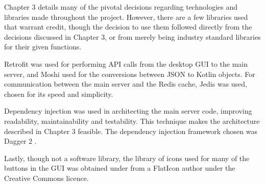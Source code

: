 Chapter 3 details many of the pivotal decisions regarding technologies and libraries made throughout the project. However, there are a few libraries used that warrant credit, though the decision to use them followed directly from the decisions discussed in Chapter 3, or from merely being industry standard libraries for their given functions.

Retrofit \cite{retrofit} was used for performing API calls from the desktop GUI to the main server, and Moshi \cite{moshi} used for the conversions between JSON to Kotlin objects. For communication between the main server and the Redis cache, Jedis \cite{jedis} was used, chosen for its speed and simplicity.

Dependency injection was used in architecting the main server code, improving readability, maintainability and testability. This technique makes the architecture described in Chapter 3 feasible. The dependency injection framework chosen was Dagger 2 \cite{dagger2}.

Lastly, though not a software library, the library of icons used for many of the buttons in the GUI was obtained under from a FlatIcon author \cite{flaticon} under the Creative Commons licence.

